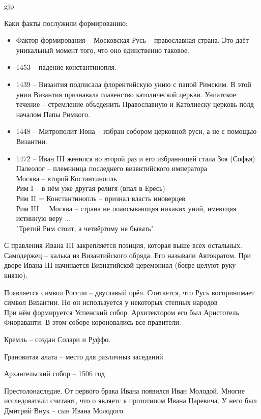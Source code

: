 gjp	 \documentclass[12pt,a4paper]{article}
\begin{document}
 Каки факты послужили формированию:
 \begin{itemize}
 	\item Фактор формирования -- Московская Русь -- православная страна. Это даёт уникальный момент того, что оно единственно таковое.
 	\item 1453 -- падение константинопля.
 	\item 1439 -- Византия подписала флорентийскую унию с папой Римским. В этой унии Византия признавала главенство католической церкви. Униатское течение -- стремление объеденить Православную и Католиеску церковь полд началом Папы Римкого.
 	\item 1448 -- Митрополит Иона -- избран собором церковной руси, а не с помощью Византии.
 	\item 1472 -- Иван III женился во второй раз и его избранницей стала Зоя (Софья) Палеолог -- племнница последнего визвнтийского императора\\Москва -- второй Костантинопль\\
 	Рим I -- в нём уже другая религя (впал в Ересь)\\
 	Рим II = Константинопль -- признал власть иноверцев\\ 
 	Рим III = Москва -- страна не поаисывающяя никаких уний, имеющяя истинную веру ...\\
 	"Третий Рим стоит, а четвёртому не бывать"
 \end{itemize}
 С правления Ивана III закрепляется позиция, которая выше всех остальных. 
 Самодержец -- калька из Византийского обряда. Его называли Автократом.
 При дворе Ивана III начинается Визнатийской церемониал (бояре целуют руку князю).
 
 Появляется символ России -- двуглавый орёл. Считается, что Русь воспринимает символ Византии. Но он используется у некоторых степных народов\\
 
 При нём формируется Успенский собор. Архитектором его был Аристотель Фиораванти. В этом соборе короновались все правители.
 
 Кремль -- создан Солари и Руффо. 
 
 Грановитая алата -- место для различныз заседаний.
 
 Архангельский собор -- 1506 год 
 
 Престолонаследие.
 От первого брака Ивана появился Иван Молодой. Многие исследователи считают, что о являетс я прототипом Ивана Царевича. У него был Дмитрий Внук -- сын Ивана Молодого.
 
\end{document}

